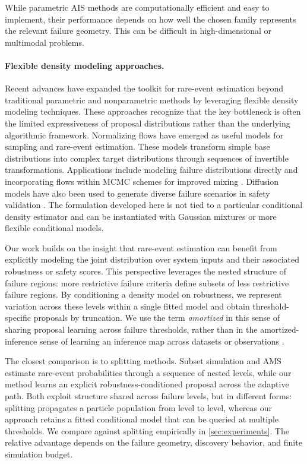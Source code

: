 \documentclass[twoside,11pt]{article}
\begin{document}
While parametric AIS methods are computationally efficient and easy to implement, their performance depends on how well the chosen family represents the relevant failure geometry. This can be difficult in high-dimensional or multimodal problems.

\paragraph{Flexible density modeling approaches.}
Recent advances have expanded the toolkit for rare-event estimation beyond traditional parametric and nonparametric methods by leveraging flexible density modeling techniques. These approaches recognize that the key bottleneck is often the limited expressiveness of proposal distributions rather than the underlying algorithmic framework. Normalizing flows \citep{papamakarios2021normalizing} have emerged as useful models for sampling and rare-event estimation. These models transform simple base distributions into complex target distributions through sequences of invertible transformations. Applications include modeling failure distributions directly \citep{sinha2020neural,gao2023rareflows,ye2024flow} and incorporating flows within MCMC schemes for improved mixing \citep{sinha2020neural}. Diffusion models have also been used to generate diverse failure scenarios in safety validation \citep{delecki2024diffusion}. The formulation developed here is not tied to a particular conditional density estimator and can be instantiated with Gaussian mixtures or more flexible conditional models.

Our work builds on the insight that rare-event estimation can benefit from explicitly modeling the joint distribution over system inputs and their associated robustness or safety scores. This perspective leverages the nested structure of failure regions: more restrictive failure criteria define subsets of less restrictive failure regions. By conditioning a density model on robustness, we represent variation across these levels within a single fitted model and obtain threshold-specific proposals by truncation. We use the term \emph{amortized} in this sense of sharing proposal learning across failure thresholds, rather than in the amortized-inference sense of learning an inference map across datasets or observations \citep{kingma2014auto}.

The closest comparison is to splitting methods. Subset simulation and AMS estimate rare-event probabilities through a sequence of nested levels, while our method learns an explicit robustness-conditioned proposal across the adaptive path. Both exploit structure shared across failure levels, but in different forms: splitting propagates a particle population from level to level, whereas our approach retains a fitted conditional model that can be queried at multiple thresholds. We compare against splitting empirically in \cref{sec:experiments}. The relative advantage depends on the failure geometry, discovery behavior, and finite simulation budget.
\end{document}

